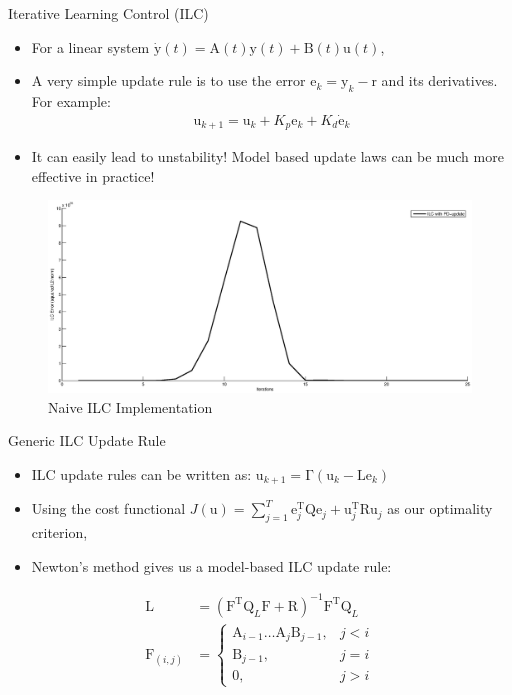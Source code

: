 \documentclass[handout]{beamer}
\newcommand{\boldvec}[1]{\boldsymbol{\mathrm{#1}}}
\let\vec\boldvec
\newcommand{\state}{\vec{y}} %
\newcommand{\error}{\vec{e}} %
\newcommand{\traj}{\vec{r}} %
\newcommand{\sysInput}{\vec{u}} %
\newcommand{\qmatrix}{\vec{\Gamma}} %
\newcommand{\lmatrix}{\vec{L}} %
\begin{document}
\begin{frame}{Iterative Learning Control (ILC)}
\begin{itemize}
\item For a linear system $\dot{\state}(t) = \boldvec{A}(t)\state(t) + \boldvec{B}(t)\sysInput(t)$,
\item A very simple update rule is to use the error $\error_k = \state_k - \traj$ and its derivatives. For example:
\begin{equation*}
\begin{aligned}
\sysInput_{k+1} = \sysInput_{k} + K_{p}\error_k + K_{d}\dot{\error}_k
\end{aligned}
\end{equation*}
\item It can easily lead to unstability! Model based update laws can be much more effective in practice!
\end{itemize}
\begin{figure}
\center
\includegraphics[scale=0.2]{ilcBlowup}			
\caption{Naive ILC Implementation}
\end{figure}
\end{frame}
%
\begin{frame}{Generic ILC Update Rule}
\begin{itemize}
\item ILC update rules can be written as: $\sysInput_{k+1} = \qmatrix(\sysInput_{k} - \lmatrix\error_{k})$
\item Using the cost functional $J(\sysInput) = \sum_{j=1}^{T} \error_j^{\mathrm{T}}\vec{Q}\error_j + \sysInput_j^{\mathrm{T}}\vec{R}\sysInput_j$ as our optimality criterion,
\item Newton's method gives us a model-based ILC update rule: 
\end{itemize}
\begin{equation*}
\begin{aligned}
\lmatrix &= (\vec{F}^{\mathrm{T}}\vec{Q}_L\vec{F} + \vec{R})^{-1}\vec{F}^{\mathrm{T}}\vec{Q}_L \\
\vec{F}_{(i,j)} &= \left \{
\begin{array}{cc}
\vec{A}_{i-1}\ldots \vec{A}_j\vec{B}_{j-1}, & j < i \\ 
\vec{B}_{j-1}, & j = i \\
\vec{0}, & j > i 
\end{array} \right.
\end{aligned}
\end{equation*}
\end{frame}
\end{document}
